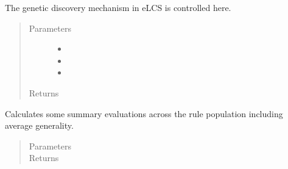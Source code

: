 \documentclass[letterpaper,10pt,english]{sphinxmanual}
\begin{document}
\begin{fulllineitems}

\begin{fulllineitems}
\label{\detokenize{eLCS:eLCS.ClassifierSet.ClassifierSet.runGA}}
The genetic discovery mechanism in eLCS is controlled here.
\begin{quote}\begin{description}
\item[{Parameters}] \leavevmode\begin{itemize}
\item {} 
 \textendash{} 

\item {} 
 \textendash{} 

\item {} 
 \textendash{} 

\end{itemize}

\item[{Returns}] \leavevmode


\end{description}\end{quote}

\end{fulllineitems}


\begin{fulllineitems}
\label{\detokenize{eLCS:eLCS.ClassifierSet.ClassifierSet.runPopAveEval}}
Calculates some summary evaluations across the rule population including average generality.
\begin{quote}\begin{description}
\item[{Parameters}] \leavevmode
{} \textendash{} 

\item[{Returns}] \leavevmode


\end{description}\end{quote}

\end{fulllineitems}



\end{fulllineitems}
\end{document}
